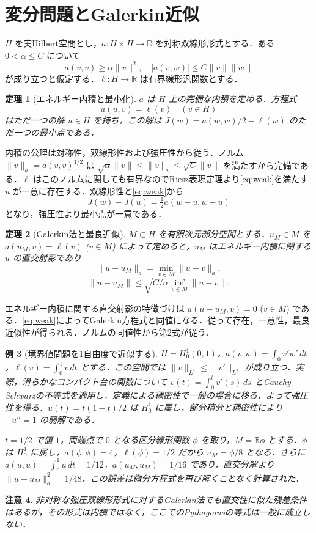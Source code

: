 \documentclass[a5paper,10pt,onecolumn]{jsarticle}
\makeatletter
\theoremstyle{mathnotetheorem}
\newtheorem{theorem}{定理}[section]
\newtheorem{example}[theorem]{例}
\newtheorem{remark}[theorem]{注意}
\renewcommand{\proofname}{証明}
\renewenvironment{proof}[1][\proofname]{%
  \par\pushQED{\qed}\normalfont\topsep4\p@\@plus2\p@\relax
  \trivlist\item[\hskip\labelsep\bfseries #1]\ignorespaces
}{\popQED\endtrivlist\@endpefalse}
\newcommand{\R}{\mathbb{R}}
\newcommand{\norm}[1]{\lVert #1\rVert}
\makeatother
\begin{document}
\section{変分問題とGalerkin近似}
$H$ を実Hilbert空間とし，$a:H\times H\to\R$ を対称双線形形式とする．ある $0<\alpha\le C$ について
\[
 a(v,v)\ge\alpha\norm v^2,\quad
 |a(v,w)|\le C\norm v\norm w
\]
が成り立つと仮定する．$\ell:H\to\R$ は有界線形汎関数とする．
\begin{theorem}[エネルギー内積と最小化]
$a$ は $H$ 上の完備な内積を定める．方程式
\begin{equation}\label{eq:weak}
 a(u,v)=\ell(v)\quad(v\in H)
\end{equation}
はただ一つの解 $u\in H$ を持ち，この解は $J(w)=a(w,w)/2-\ell(w)$ のただ一つの最小点である．
\end{theorem}
\begin{proof}
内積の公理は対称性，双線形性および強圧性から従う．ノルム $\norm v_a=a(v,v)^{1/2}$ は $\sqrt\alpha\norm v\le\norm v_a\le\sqrt C\norm v$ を満たすから完備である．$\ell$ はこのノルムに関しても有界なのでRiesz表現定理より\eqref{eq:weak}を満たす $u$ が一意に存在する．双線形性と\eqref{eq:weak}から
\[
 J(w)-J(u)=\tfrac12 a(w-u,w-u)
\]
となり，強圧性より最小点が一意である．
\end{proof}
\begin{theorem}[Galerkin法と最良近似]
$M\subset H$ を有限次元部分空間とする．$u_M\in M$ を $a(u_M,v)=\ell(v)$ ($v\in M$) によって定めると，$u_M$ はエネルギー内積に関する $u$ の直交射影であり
\[
 \norm{u-u_M}_a=\min_{v\in M}\norm{u-v}_a,
\]
\[
 \norm{u-u_M}\le\sqrt{C/\alpha}\inf_{v\in M}\norm{u-v}.
\]
\end{theorem}
\begin{proof}
エネルギー内積に関する直交射影の特徴づけは $a(u-u_M,v)=0$ ($v\in M$) である．\eqref{eq:weak}によってGalerkin方程式と同値になる．従って存在，一意性，最良近似性が得られる．ノルムの同値性から第2式が従う．
\end{proof}
\begin{example}[境界値問題を1自由度で近似する]
$H=H^1_0(0,1)$，$a(v,w)=\int_0^1 v'w'\,dt$，$\ell(v)=\int_0^1v\,dt$ とする．この空間では $\norm v_{L^2}\le\norm{v'}_{L^2}$ が成り立つ．実際，滑らかなコンパクト台の関数について $v(t)=\int_0^t v'(s)\,ds$ とCauchy--Schwarzの不等式を適用し，定義による稠密性で一般の場合に移る．よって強圧性を得る．$u(t)=t(1-t)/2$ は $H^1_0$ に属し，部分積分と稠密性により $-u''=1$ の弱解である．

$t=1/2$ で値 $1$，両端点で $0$ となる区分線形関数 $\phi$ を取り，$M=\R\phi$ とする．$\phi$ は $H^1_0$ に属し，$a(\phi,\phi)=4$，$\ell(\phi)=1/2$ だから $u_M=\phi/8$ となる．さらに $a(u,u)=\int_0^1u\,dt=1/12$，$a(u_M,u_M)=1/16$ であり，直交分解より $\norm{u-u_M}_a^2=1/48$．この誤差は微分方程式を再び解くことなく計算された．
\end{example}
\begin{remark}
非対称な強圧双線形形式に対するGalerkin法でも直交性に似た残差条件はあるが，その形式は内積ではなく，ここでのPythagorasの等式は一般に成立しない．
\end{remark}
\end{document}
